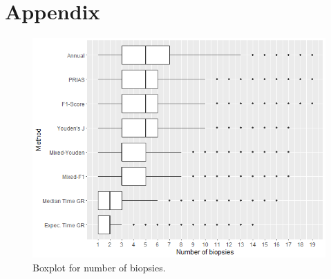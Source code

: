 
\section{Appendix}



\begin{figure}
	\centerline{\includegraphics[width=\columnwidth]{images/sim_study/nbBoxPlot_all.png}}
    \caption{Boxplot for number of biopsies.}
    \label{fig : nbBoxPlot}
\end{figure}

